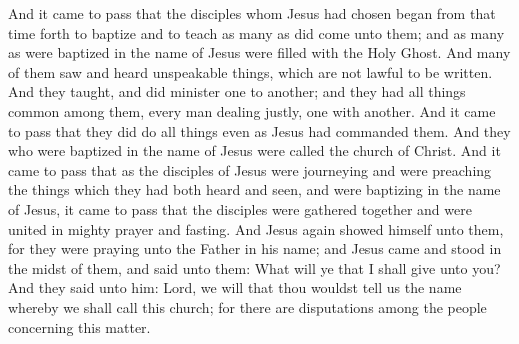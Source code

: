 And it came to pass that the disciples whom Jesus had chosen began from that time forth to baptize and to teach as many as did come unto them; and as many as were baptized in the name of Jesus were filled with the Holy Ghost.
\bverse \iffalse And many of them saw and heard unspeakable things, which are not lawful to be written. \fi
And many of them saw and heard unspeakable things, which are not lawful to be written.
\bverse \iffalse And they taught, and did minister one to another; and they had all things common among them, every man dealing justly, one with another. \fi
And they taught, and did minister one to another; and they had all things common among them, every man dealing justly, one with another.
\bverse \iffalse And it came to pass that they did do all things even as Jesus had commanded them. \fi
And it came to pass that they did do all things even as Jesus had commanded them.
\bverse \iffalse And they who were baptized in the name of Jesus were called the church of Christ. \fi
And they who were baptized in the name of Jesus were called the church of Christ.
\bchapter
\bverse \iffalse And it came to pass that as the disciples of Jesus were journeying and were preaching the things which they had both heard and seen, and were baptizing in the name of Jesus, it came to pass that the disciples were gathered together and were united in mighty prayer and fasting. \fi
And it came to pass that as the disciples of Jesus were journeying and were preaching the things which they had both heard and seen, and were baptizing in the name of Jesus, it came to pass that the disciples were gathered together and were united in mighty prayer and fasting.
\bverse \iffalse And Jesus again showed himself unto them, for they were praying unto the Father in his name; and Jesus came and stood in the midst of them, and said unto them: What will ye that I shall give unto you? \fi
And Jesus again showed himself unto them, for they were praying unto the Father in his name; and Jesus came and stood in the midst of them, and said unto them: What will ye that I shall give unto you?
\bverse \iffalse And they said unto him: Lord, we will that thou wouldst tell us the name whereby we shall call this church; for there are disputations among the people concerning this matter. \fi
And they said unto him: Lord, we will that thou wouldst tell us the name whereby we shall call this church; for there are disputations among the people concerning this matter.
\bverse \iffalse And the Lord said unto them: Verily, verily, I say unto you, why is it that the people should murmur and dispute because of this thing? \fi
